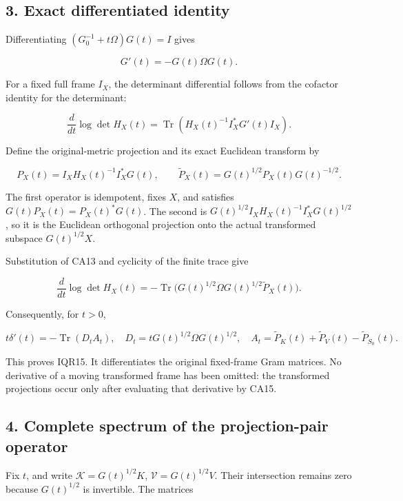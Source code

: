 \documentclass[11pt]{article}
\begin{document}
\subsection{3. Exact differentiated identity}\label{exact-differentiated-identity}

Differentiating \((G_0^{-1}+t\Omega)G(t)=I\) gives

\[
G'(t)=-G(t)\Omega G(t).
\tag{CA13}
\]

For a fixed full frame \(I_X\), the determinant differential follows from the cofactor identity for the determinant:

\[
\frac{d}{dt}\log\det H_X(t)
=\operatorname{Tr}(H_X(t)^{-1}I_X^*G'(t)I_X).
\]

Define the original-metric projection and its exact Euclidean transform by

\[
P_X(t)=I_XH_X(t)^{-1}I_X^*G(t),
\qquad
\widetilde P_X(t)=G(t)^{1/2}P_X(t)G(t)^{-1/2}.
\tag{CA14}
\]

The first operator is idempotent, fixes \(X\), and satisfies \(G(t)P_X(t)=P_X(t)^*G(t)\). The second is \(G(t)^{1/2}I_XH_X(t)^{-1}I_X^*G(t)^{1/2}\), so it is the Euclidean orthogonal projection onto the actual transformed subspace \(G(t)^{1/2}X\).

Substitution of CA13 and cyclicity of the finite trace give

\[
\frac{d}{dt}\log\det H_X(t)
=-\operatorname{Tr}\bigl(G(t)^{1/2}\Omega G(t)^{1/2}
\widetilde P_X(t)\bigr).
\tag{CA15}
\]

Consequently, for \(t>0\),

\[
t\delta'(t)=-\operatorname{Tr}(D_tA_t),
\quad D_t=tG(t)^{1/2}\Omega G(t)^{1/2},
\quad A_t=\widetilde P_K(t)+\widetilde P_V(t)-\widetilde P_{S_0}(t).
\tag{CA16}
\]

This proves IQR15. It differentiates the original fixed-frame Gram matrices. No derivative of a moving transformed frame has been omitted: the transformed projections occur only after evaluating that derivative by CA15.

\subsection{4. Complete spectrum of the projection-pair operator}\label{complete-spectrum-of-the-projection-pair-operator}

Fix \(t\), and write \(\mathcal K=G(t)^{1/2}K\), \(\mathcal V=G(t)^{1/2}V\). Their intersection remains zero because \(G(t)^{1/2}\) is invertible. The matrices
\end{document}
